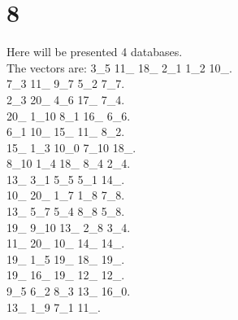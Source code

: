 \chapter{8}
\indent Here will be presented 4 databases.\\
The vectors are:
3\_5 11\_ 18\_ 2\_1 1\_2 10\_.\\7\_3 11\_ 9\_7 5\_2 7\_7.\\2\_3 20\_ 4\_6 17\_ 7\_4.\\20\_ 1\_10 8\_1 16\_ 6\_6.\\6\_1 10\_ 15\_ 11\_ 8\_2.\\15\_ 1\_3 10\_0 7\_10 18\_.\\8\_10 1\_4 18\_ 8\_4 2\_4.\\13\_ 3\_1 5\_5 5\_1 14\_.\\10\_ 20\_ 1\_7 1\_8 7\_8.\\13\_ 5\_7 5\_4 8\_8 5\_8.\\19\_ 9\_10 13\_ 2\_8 3\_4.\\11\_ 20\_ 10\_ 14\_ 14\_.\\19\_ 1\_5 19\_ 18\_ 19\_.\\19\_ 16\_ 19\_ 12\_ 12\_.\\9\_5 6\_2 8\_3 13\_ 16\_0.\\13\_ 1\_9 7\_1 11\_.\\